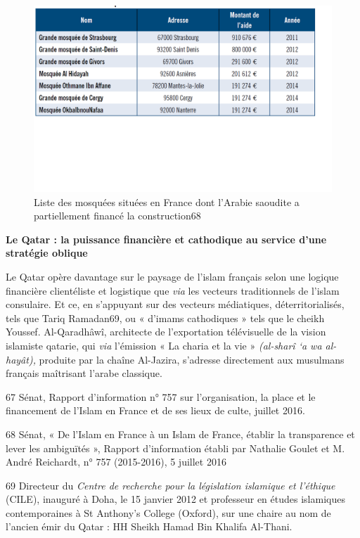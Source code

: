 \begin{figure}
    \centering
    \includegraphics{ImageIslamFrance/MosqueeArabieSaoudite.png}
    \caption{Liste des mosquées situées en France dont l'Arabie saoudite a
partiellement financé la construction68}
    \label{fig:MosqueeArabieSaoudite}
\end{figure}

\textbf{Le Qatar : la puissance financière et cathodique au service
d'une stratégie oblique}

Le Qatar opère davantage sur le paysage de l'islam français selon une
logique financière clientéliste et logistique que \emph{via} les
vecteurs traditionnels de l'islam consulaire. Et ce, en s'appuyant sur
des vecteurs médiatiques, déterritorialisés, tels que Tariq Ramadan69,
ou « d'imams cathodiques » tels que le cheikh Youssef. Al-Qaradhâwî,
architecte de l'exportation télévisuelle de la vision islamiste qatarie,
qui \emph{via} l'émission « La charia et la vie » \emph{(al-sharî `a wa
al-hayât),} produite par la chaîne Al-Jazira, s'adresse directement aux
musulmans français maîtrisant l'arabe classique.

67 Sénat, Rapport d'information n° 757 sur l'organisation, la place et
le financement de l'Islam en France et de ses lieux de culte, juillet
2016.

68 Sénat, « De l'Islam en France à un Islam de France, établir la
transparence et lever les ambiguïtés », Rapport d'information établi par
Nathalie Goulet et M. André Reichardt, n° 757 (2015-2016), 5 juillet
2016

69 Directeur du \emph{Centre de recherche pour la législation islamique
et l'éthique} (CILE), inauguré à Doha, le 15 janvier 2012 et professeur
en études islamiques contemporaines à St Anthony's College (Oxford), sur
une chaire au nom de l'ancien émir du Qatar : HH Sheikh Hamad Bin
Khalifa Al-Thani.

